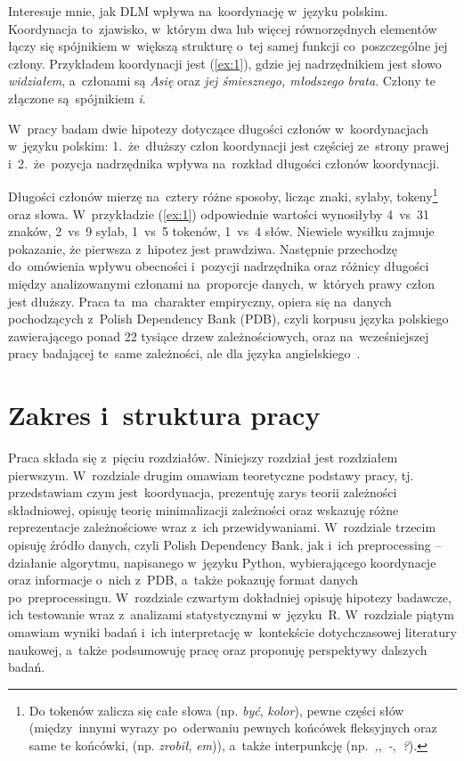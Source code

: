 \documentclass[licencjacka]{pracamgr_Kogni}
\begin{document}
    Interesuje mnie, jak DLM wpływa na~koordynację w~języku polskim.
    Koordynacja to~zjawisko, w~którym dwa lub więcej równorzędnych elementów łączy się spójnikiem w~większą strukturę o~tej samej funkcji co~poszczególne jej człony.
    Przykładem koordynacji jest (\ref{ex:1}), gdzie jej nadrzędnikiem jest słowo \textit{widziałem}, a~członami są \textit{Asię} oraz \textit{jej śmiesznego, młodszego brata}.
    Człony te złączone są~spójnikiem \textit{i}.

    W~pracy badam dwie hipotezy dotyczące długości członów w~koordynacjach w~języku polskim: 1.~że~dłuższy człon koordynacji jest częściej ze~strony prawej i~2.~że~pozycja nadrzędnika wpływa na~rozkład długości członów koordynacji.

    Długości członów mierzę na~cztery różne sposoby, licząc znaki, sylaby, tokeny\footnote{Do tokenów zalicza się całe słowa (np. \textit{być}, \textit{kolor}), pewne części słów (między~innymi wyrazy po~oderwaniu pewnych końcówek fleksyjnych oraz same te końcówki, (np. \textit{zrobił}, \textit{em})), a~także interpunkcję (np.~\textit{,},~\textit{-},~\textit{?}).} oraz słowa.
    W~przykładzie (\ref{ex:1}) odpowiednie wartości wynosiłyby 4~vs~31 znaków, 2~vs~9 sylab, 1~vs~5 tokenów, 1~vs~4 słów.
    Niewiele wysiłku zajmuje pokazanie, że pierwsza z~hipotez jest prawdziwa.
    Następnie przechodzę do~omówienia wpływu obecności i~pozycji nadrzędnika oraz różnicy długości między analizowanymi członami na~proporcje danych, w~których prawy człon jest dłuższy.
    Praca ta~ma~charakter empiryczny, opiera się na~danych pochodzących z~Polish Dependency Bank (PDB), czyli korpusu języka polskiego zawierającego ponad 22 tysiące drzew zależnościowych, oraz na~wcześniejszej pracy badającej te~same zależności, ale dla języka angielskiego~\citep{Przepiorkowski2023}.


    \section{Zakres i~struktura pracy}\label{sec:zakres-istruktura-pracy}
    Praca składa się z~pięciu rozdziałów. 
    Niniejszy rozdział jest rozdziałem pierwszym.
    W~rozdziale drugim omawiam teoretyczne podstawy pracy, tj. przedstawiam czym jest~koordynacja, prezentuję zarys teorii zależności składniowej, opisuję teorię minimalizacji zależności oraz wskazuję różne reprezentacje zależnościowe wraz z~ich przewidywaniami.
    W~rozdziale trzecim opisuję źródło danych, czyli Polish Dependency Bank, jak i~ich preprocessing -- działanie algorytmu, napisanego w~języku Python, wybierającego koordynacje oraz informacje o~nich z~PDB, a~także pokazuję format danych po~preprocessingu.
    W~rozdziale czwartym dokładniej opisuję hipotezy badawcze, ich testowanie wraz z~analizami statystycznymi w~języku~R. W~rozdziale piątym omawiam wyniki badań i~ich interpretację w~kontekście dotychczasowej literatury naukowej, a~także podsumowuję pracę oraz proponuję perspektywy dalszych badań.
\end{document}
